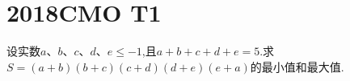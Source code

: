 \documentclass[]{article}
\title{}
\author{}
\date{}
\begin{document}
\maketitle
\section{2018CMO T1}{
设实数$a、b、c、d、e\leq -1$,且$a+b+c+d+e=5$.求\\
$S=(a+b)(b+c)(c+d)(d+e)(e+a)$的最小值和最大值.
}
\end{document}
